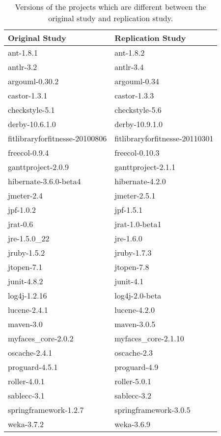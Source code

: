 \documentclass{uvamscse}
\begin{document}
\begin{table} [h!]
\begin{center}
\begin{tabular}[c]{ |p{45mm} | p{45mm} |}
  \hline
Original Study & Replication Study \\
\hline
\hline
ant-1.8.1 & ant-1.8.2 \\ 
antlr-3.2 & antlr-3.4 \\
argouml-0.30.2 & argouml-0.34 \\
castor-1.3.1 & castor-1.3.3  \\
checkstyle-5.1 & checkstyle-5.6 \\
derby-10.6.1.0 & derby-10.9.1.0 \\
fitlibraryforfitnesse-20100806 & fitlibraryforfitnesse-20110301 \\
freecol-0.9.4 & freecol-0.10.3 \\
ganttproject-2.0.9 & ganttproject-2.1.1 \\
hibernate-3.6.0-beta4 & hibernate-4.2.0 \\
jmeter-2.4 & jmeter-2.5.1 \\
jpf-1.0.2 & jpf-1.5.1 \\
jrat-0.6 & jrat-1.0-beta1 \\
jre-1.5.0\_22 & jre-1.6.0 \\
jruby-1.5.2 & jruby-1.7.3 \\
jtopen-7.1 & jtopen-7.8 \\
junit-4.8.2 & junit-4.1 \\
log4j-1.2.16 & log4j-2.0-beta \\
lucene-2.4.1 & lucene-4.2.0 \\
maven-3.0 & maven-3.0.5 \\
myfaces\_core-2.0.2 & myfaces\_core-2.1.10 \\
oscache-2.4.1 & oscache-2.3 \\
proguard-4.5.1 & proguard-4.9 \\
roller-4.0.1 & roller-5.0.1 \\
sablecc-3.1 & sablecc-3.2 \\
springframework-1.2.7 & springframework-3.0.5 \\
weka-3.7.2 & weka-3.6.9 \\
  \hline 
\end{tabular}
\caption{Versions of the projects which are different between the original study and replication study.}
\label{table:DifferencesProjects}
\end{center}
\end{table}
\end{document}
